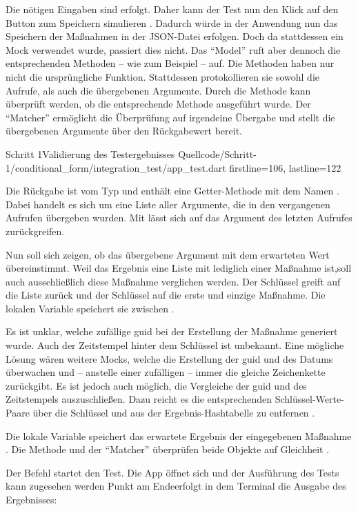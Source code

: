 Die nötigen Eingaben sind erfolgt.
Daher kann der Test nun den Klick auf den Button zum Speichern simulieren .
Dadurch würde in der Anwendung nun das Speichern der Maßnahmen in der JSON-Datei erfolgen.
Doch da stattdessen ein Mock verwendet wurde, passiert dies nicht.
Das \enquote{Model} ruft aber dennoch die entsprechenden Methoden -- wie zum Beispiel  -- auf.
Die Methoden haben nur nicht die ursprüngliche Funktion.
Stattdessen protokollieren sie sowohl die Aufrufe, als auch die übergebenen Argumente.
Durch die Methode   kann überprüft werden, ob die entsprechende Methode  ausgeführt wurde.
Der \enquote{Matcher}  ermöglicht die Überprüfung auf irgendeine Übergabe und stellt die übergebenen Argumente über den Rückgabewert bereit.

\begin{alexlisting}{Schritt 1}{Validierung des Testergebnisses}
  {Quellcode/Schritt-1/conditional_form/integration_test/app_test.dart}
  {firstline=106, lastline=122}
\end{alexlisting}

Die Rückgabe ist vom Typ  und enthält eine Getter-Methode mit dem Namen .
Dabei handelt es sich um eine Liste aller Argumente, die in den vergangenen Aufrufen übergeben wurden.
Mit  lässt sich auf das Argument des letzten Aufrufes zurückgreifen.

Nun soll sich zeigen, ob das übergebene Argument mit dem erwarteten Wert übereinstimmt.
Weil das Ergebnis eine Liste mit lediglich einer Maßnahme ist,soll auch ausschließlich diese Maßnahme verglichen werden.
Der Schlüssel  greift auf die Liste zurück und der Schlüssel  auf die erste und einzige Maßnahme.
Die lokalen Variable  speichert sie zwischen .

Es ist unklar, welche zufällige guid bei der Erstellung der Maßnahme generiert wurde.
Auch der Zeitstempel hinter dem Schlüssel  ist unbekannt.
Eine mögliche Lösung wären weitere Mocks, welche die Erstellung der guid und des Datums überwachen und -- anstelle einer zufälligen -- immer die gleiche Zeichenkette zurückgibt.
Es ist jedoch auch möglich, die Vergleiche der guid und des Zeitstempels auszuschließen.
Dazu reicht es die entsprechenden Schlüssel-Werte-Paare über die Schlüssel  und  aus der Ergebnis-Hashtabelle zu entfernen .

Die lokale Variable  speichert das erwartete Ergebnis der eingegebenen Maßnahme .
Die Methode  und der \enquote{Matcher}  überprüfen beide Objekte auf Gleichheit .

Der Befehl  startet den Test. Die App öffnet sich und der Ausführung des Tests kann zugesehen werden Punkt am Endeerfolgt in dem Terminal die Ausgabe des Ergebnisses: 


\ifIncludeFigures \clearpage \fi
